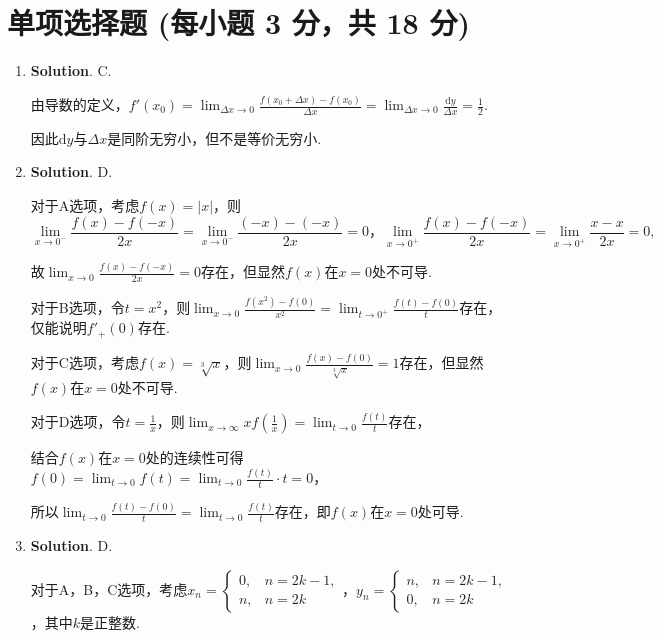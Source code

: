 \documentclass[../Main.tex]{subfiles}
\begin{document}
\section{单项选择题 (每小题 3 分，共 18 分)}
\begin{enumerate}
    \item \textbf{Solution}. C.

          由导数的定义，$f'(x_{0})=\lim_{\Delta x\to0}\frac{f(x_{0}+\Delta x)-f(x_{0})}{\Delta
                  x}=\lim_{\Delta x\to0}\frac{\mathrm{d}y}{\Delta x}=\frac{1}{2}$.

          因此$\mathrm{d}y$与$\Delta x$是同阶无穷小，但不是等价无穷小.

    \item \textbf{Solution}. D.

          对于A选项，考虑$f(x)=|x|$，则
          \[
              \lim_{x\to0^-}\frac{f(x)-f(-x)}{2x}=\lim_{x\to0^-}\frac{(-x)-(-x)}{2x}= 0
              \text{，}\lim_{x\to0^+}\frac{f(x)-f(-x)}{2x}=\lim_{x\to0^+}\frac{x-x}{2x}
              =0,
          \]

          故$\lim_{x\to0}\frac{f(x)-f(-x)}{2x}=0$存在，但显然$f(x)$在$x=0$处不可导.

          对于B选项，令$t=x^{2}$，则$\lim_{x\to0}\frac{f(x^{2})-f(0)}{x^{2}}=\lim_{t\to0^+}
              \frac{f(t)-f(0)}{t}$存在，仅能说明$f'_{+}(0)$存在.

          对于C选项，考虑$f(x)=\sqrt[3]{x}$，则$\lim_{x\to0}\frac{f(x)-f(0)}{\sqrt[3]{x}}
              =1$存在，但显然$f(x)$在$x=0$处不可导.

          对于D选项，令$t=\frac{1}{x}$，则$\lim_{x\to\infty}x f\left(\frac{1}{x}\right
              )=\lim_{t\to0}\frac{f(t)}{t}$存在，

          结合$f(x)$在$x=0$处的连续性可得$f(0)=\lim_{t\to0}f(t)=\lim_{t\to0}\frac{f(t)}{t}
              \cdot t=0$，

          所以$\lim_{t\to0}\frac{f(t)-f(0)}{t}=\lim_{t\to0}\frac{f(t)}{t}$存在，即$f(
              x)$在$x=0$处可导.

    \item \textbf{Solution}. D.

          对于A，B，C选项，考虑$x_{n}=
              \begin{cases}
                  0, & n=2k-1, \\
                  n, & n=2k
              \end{cases}$，$y_{n}=
              \begin{cases}
                  n, & n=2k-1, \\
                  0, & n=2k
              \end{cases}$，其中$k$是正整数.


\end{enumerate}
\end{document}
